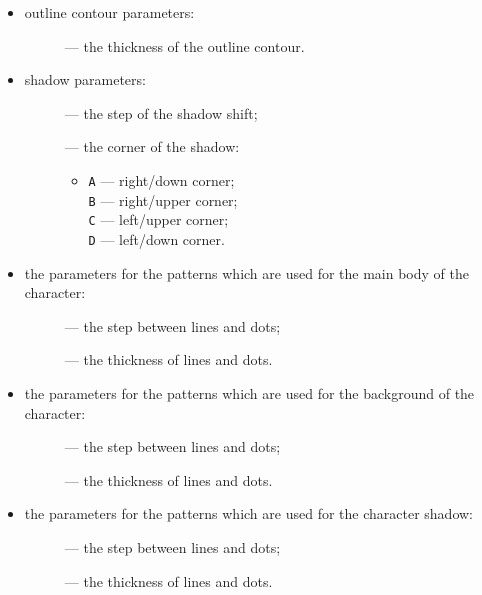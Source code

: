 \begin{itemize}

\item outline contour parameters:
\begin{description}
\item[] ---
the thickness of the outline contour.
\end{description}

\item shadow parameters:
\begin{description}
\item[] ---
the step of the shadow shift;
\item[] ---
the corner of the shadow:
\begin{itemize}
\item[]{\tt A} --- right/down corner;\\
       {\tt B} --- right/upper corner;\\
       {\tt C} --- left/upper corner;\\
       {\tt D} --- left/down corner.
\end{itemize}
\end{description}

\item the parameters for the patterns which are used
      for the main body of the character:
\begin{description}
\item[] ---
the step between lines and dots;
\item[] ---
the thickness of lines and dots.
\end{description}

\item the parameters for the patterns which are used
      for the background of the character:
\begin{description}
\item[] ---
the step between lines and dots;
\item[] ---
the thickness of lines and dots.
\end{description}

\item the parameters for the patterns which are used
      for the character shadow:
\begin{description}
\item[] ---
the step between lines and dots;
\item[] ---
the thickness of lines and dots.
\end{description}
\end{itemize}

